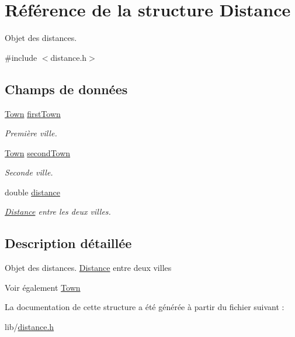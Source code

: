 \hypertarget{structDistance}{
\section{Référence de la structure Distance}
\label{structDistance}
}


Objet des distances.  




{\ttfamily \#include $<$distance.h$>$}

\subsection*{Champs de données}
\begin{DoxyCompactItemize}
\item 
\hypertarget{structDistance_a619a6ef491d8538423e056dda49b72d2}{
\hyperlink{structTown}{Town} \hyperlink{structDistance_a619a6ef491d8538423e056dda49b72d2}{firstTown}}
\label{structDistance_a619a6ef491d8538423e056dda49b72d2}

\begin{DoxyCompactList}\small\item\em Première ville. \item\end{DoxyCompactList}\item 
\hypertarget{structDistance_aed7e33174b78e759a6be730017bc60ab}{
\hyperlink{structTown}{Town} \hyperlink{structDistance_aed7e33174b78e759a6be730017bc60ab}{secondTown}}
\label{structDistance_aed7e33174b78e759a6be730017bc60ab}

\begin{DoxyCompactList}\small\item\em Seconde ville. \item\end{DoxyCompactList}\item 
\hypertarget{structDistance_a6cd9b7d2a0b38abc488a875aee005538}{
double \hyperlink{structDistance_a6cd9b7d2a0b38abc488a875aee005538}{distance}}
\label{structDistance_a6cd9b7d2a0b38abc488a875aee005538}

\begin{DoxyCompactList}\small\item\em \hyperlink{structDistance}{Distance} entre les deux villes. \item\end{DoxyCompactList}\end{DoxyCompactItemize}


\subsection{Description détaillée}
Objet des distances. \hyperlink{structDistance}{Distance} entre deux villes \begin{DoxySeeAlso}{Voir également}
\hyperlink{structTown}{Town} 
\end{DoxySeeAlso}


La documentation de cette structure a été générée à partir du fichier suivant :\begin{DoxyCompactItemize}
\item 
lib/\hyperlink{distance_8h}{distance.h}\end{DoxyCompactItemize}
